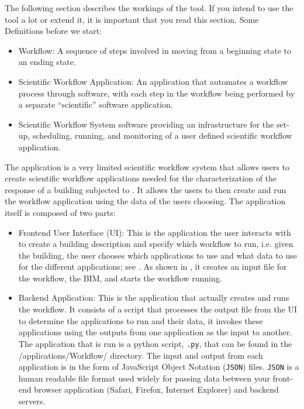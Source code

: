 
The following section describes the workings of the tool. If you
intend to use the tool a lot or extend it, it is important that you
read this section.  Some Definitions before we start:
\begin{itemize}
\item Workflow: A sequence of steps involved in moving from a
  beginning state to an ending state.
\item Scientific Workflow Application: An application that automates a
  workflow process through software, with each step in the workflow
  being performed by a separate “scientific” software application.
\item Scientific Workflow System software providing an infrastructure
  for the set-up, scheduling, running, and monitoring of a user
  defined scientific workflow application.
\end{itemize}

The \texttt{\getsoftwarename{}} application is a very limited
scientific workflow system that allows users to create scientific
workflow applications needed for the characterization of the response
of a building subjected to . It allows the users to then
create and run the workflow application using the data of the users
choosing. The application itself is composed of two parts:

\begin{itemize}
\item Frontend User Interface (UI): This is the application the user
  interacts with to create a building description and
  specify which workflow to run, i.e. given the building, the user
  chooses which applications to use and what data to use for the
  different applications; see . As shown in , it 
  creates an input file for the workflow, the BIM, and starts the workflow running.  
\item Backend Application: This is the application that actually
  creates and runs the workflow. It consists of a script that
  processes the output file from the UI to determine the applications
  to run and their data, it invokes these applications using the
  outputs from one application as the input to another. The
  application that is run is a python script, \texttt{\getsoftwarename{}.py}, that can be
  found in the /applications/Workflow/ directory.  The input and
  output from each application is in the form of JavaScript Object
  Notation (\texttt{JSON}) files. \texttt{JSON} is a human readable file format used
  widely for passing data between your front-end browser application
  (Safari, Firefox, Internet Explorer) and backend servers.
\end{itemize}


